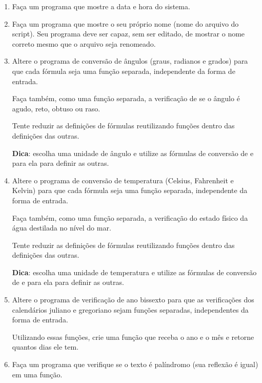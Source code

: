 \begin{enumerate}
	\modo{}{\color{white}}

	\item Faça um programa que mostre a data e hora do sistema.
	
	\item Faça um programa que mostre o seu próprio nome (nome do arquivo do script).
	Seu programa deve ser capaz, sem ser editado, de mostrar o nome correto mesmo que o arquivo seja renomeado.

	\item Altere o programa de conversão de ângulos (graus, radianos e grados) 
	para que cada fórmula seja uma função separada, independente da forma de entrada.
	
	Faça também, como uma função separada, a verificação de se o ângulo é agudo, reto, obtuso ou raso.
	
	Tente reduzir as definições de fórmulas reutilizando funções dentro das definições das outras.
	
	\textbf{Dica}: escolha uma unidade de ângulo e utilize as fórmulas de conversão de e para ela para definir as outras.

	\item Altere o programa de conversão de temperatura (Celsius, Fahrenheit e Kelvin) 
	para que cada fórmula seja uma função separada, independente da forma de entrada.
	
	Faça também, como uma função separada, a verificação do estado físico da água destilada no nível do mar.
	
	Tente reduzir as definições de fórmulas reutilizando funções dentro das definições das outras.
	
	\textbf{Dica}: escolha uma unidade de temperatura e utilize as fórmulas de conversão de e para ela para definir as outras. 

	
	\item Altere o programa de verificação de ano bissexto para que as verificações dos calendários juliano e gregoriano sejam funções separadas, independentes da forma de entrada. 
	
	Utilizando essas funções, crie uma função que receba o ano e o mês e retorne quantos dias ele tem.
	
	\quebra
	
	
	\item Faça um programa que verifique se o texto é palíndromo (sua reflexão é igual) em uma função. 
	

\end{enumerate}
